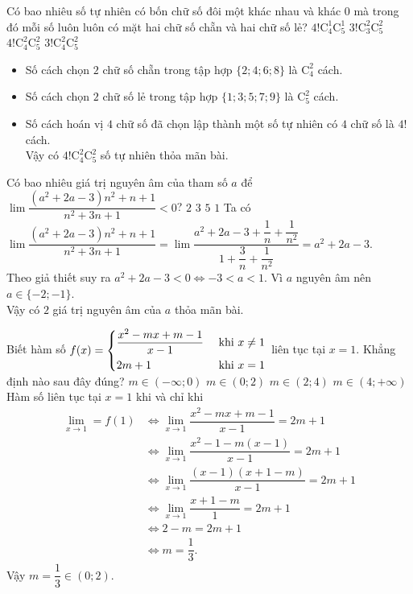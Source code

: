 \begin{ex}%
 Có bao nhiêu số tự nhiên có bốn chữ số đôi một khác nhau và khác $0$ mà trong đó mỗi số luôn luôn có mặt hai chữ số chẵn và hai chữ số lẻ?
 \choice
  {$4!\mathrm{C}_4^1\mathrm{C}_5^1$}
  {$3!\mathrm{C}_3^2\mathrm{C}_5^2$}
  {\True $4!\mathrm{C}_4^2\mathrm{C}_5^2$}
  {$3!\mathrm{C}_4^2\mathrm{C}_5^2$}
 \loigiai
  {
  \begin{itemize}
   \item Số cách chọn $2$ chữ số chẵn trong tập hợp $\{2;4;6;8\}$ là $\mathrm{C}_4^2$ cách.
   \item Số cách chọn $2$ chữ số lẻ trong tập hợp $\{1;3;5;7;9\}$ là $\mathrm{C}_5^2$ cách.
   \item Số cách hoán vị $4$ chữ số đã chọn lập thành một số tự nhiên có $4$ chữ số là $4!$ cách.\\
  Vậy có $4!\mathrm{C}_4^2\mathrm{C}_5^2$ số tự nhiên thỏa mãn bài.
  \end{itemize}
  }
\end{ex}


\begin{ex}%
 Có bao nhiêu giá trị nguyên âm của tham số $a$ để $\lim\dfrac{(a^2+2a-3) n^2+n+1}{n^2+3n+1}<0$?
 \choice
  {\True $2$}
  {$3$}
  {$5$}
  {$1$}
 \loigiai
  {
  Ta có $\lim\dfrac{(a^2+2a-3) n^2+n+1}{n^2+3n+1}=\lim\dfrac{a^2+2a-3+\dfrac{1}{n}+\dfrac{1}{n^2}}{1+\dfrac{3}{n}+\dfrac{1}{n^2}}=a^2+2a-3.$\\
  Theo giả thiết suy ra $a^2+2a-3<0\Leftrightarrow -3<a<1$. Vì $a$ nguyên âm nên $a\in \{-2;-1\}$.\\
  Vậy có $2$ giá trị nguyên âm của $a$ thỏa mãn bài.
  }
\end{ex}


\begin{ex}%
 Biết hàm số $f(x)=\left\{\begin{aligned}&\dfrac{x^2-mx+m-1}{x-1} &\text{ khi } x\neq 1\\&2m+1 &\text{ khi } x=1\end{aligned}\right.$ liên tục tại $x=1$. Khẳng định nào sau đây đúng?
 \choice
  {$m\in (-\infty;0)$}
  {\True $m\in (0;2)$}
  {$m\in (2;4)$}
  {$m\in (4;+\infty)$}
 \loigiai
  {
  Hàm số liên tục tại $x=1$ khi và chỉ khi
  \begin{align*}
   \lim\limits_{x\to 1}=f(1) &\Leftrightarrow \lim\limits_{x\to 1}\dfrac{x^2-mx+m-1}{x-1}=2m+1\\
   &\Leftrightarrow \lim\limits_{x\to 1}\dfrac{x^2-1-m(x-1)}{x-1}=2m+1\\
   &\Leftrightarrow \lim\limits_{x\to 1}\dfrac{(x-1)(x+1-m)}{x-1}=2m+1\\
   &\Leftrightarrow\lim\limits_{x\to 1}\dfrac{x+1-m}{1}=2m+1\\
   &\Leftrightarrow 2-m=2m+1\\
   &\Leftrightarrow m=\dfrac{1}{3}.
  \end{align*}
  Vậy $m=\dfrac{1}{3}\in (0;2).$
  }
\end{ex}


